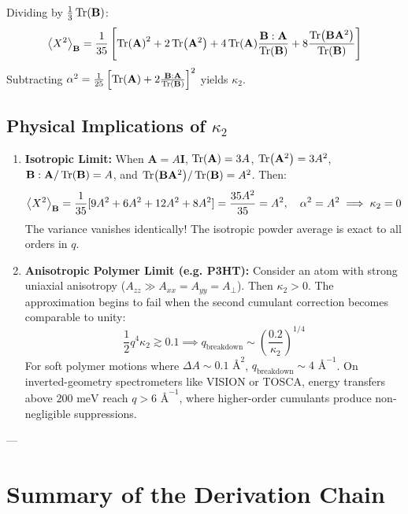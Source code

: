 \documentclass[11pt,a4paper]{article}
\theoremstyle{definition}
\begin{document}
Dividing by $\frac{1}{3}\Tr(\mathbf{B})$:
\begin{equation}
\ev{X^2}_{\mathbf{B}} = \frac{1}{35} \left[ \Tr(\mathbf{A})^2 + 2 \Tr(\mathbf{A}^2) + 4 \Tr(\mathbf{A}) \frac{\mathbf{B}:\mathbf{A}}{\Tr(\mathbf{B})} + 8 \frac{\Tr(\mathbf{B}\mathbf{A}^2)}{\Tr(\mathbf{B})} \right]
\end{equation}
Subtracting $\alpha^2 = \frac{1}{25} \left[ \Tr(\mathbf{A}) + 2 \frac{\mathbf{B}:\mathbf{A}}{\Tr(\mathbf{B})} \right]^2$ yields $\kappa_2$.

\subsection{Physical Implications of $\kappa_2$}
\begin{enumerate}
    \item \textbf{Isotropic Limit:} When $\mathbf{A} = A \mathbf{I}$, $\Tr(\mathbf{A}) = 3A$, $\Tr(\mathbf{A}^2) = 3A^2$, $\mathbf{B}:\mathbf{A}/\Tr(\mathbf{B}) = A$, and $\Tr(\mathbf{B}\mathbf{A}^2)/\Tr(\mathbf{B}) = A^2$.
    Then:
    \begin{equation}
    \ev{X^2}_{\mathbf{B}} = \frac{1}{35} [9A^2 + 6A^2 + 12A^2 + 8A^2] = \frac{35A^2}{35} = A^2, \quad \alpha^2 = A^2 \implies \kappa_2 = 0
    \end{equation}
    The variance vanishes identically! The isotropic powder average is exact to all orders in $q$.

    \item \textbf{Anisotropic Polymer Limit (e.g. P3HT):} Consider an atom with strong uniaxial anisotropy ($A_{zz} \gg A_{xx} = A_{yy} = A_\perp$). Then $\kappa_2 > 0$. The approximation begins to fail when the second cumulant correction becomes comparable to unity:
    \begin{equation}
    \frac{1}{2} q^4 \kappa_2 \gtrsim 0.1 \implies q_{\text{breakdown}} \sim \left( \frac{0.2}{\kappa_2} \right)^{1/4}
    \end{equation}
    For soft polymer motions where $\Delta A \sim 0.1\text{ \AA}^2$, $q_{\text{breakdown}} \sim 4\text{ \AA}^{-1}$. On inverted-geometry spectrometers like VISION or TOSCA, energy transfers above $200\text{ meV}$ reach $q > 6\text{ \AA}^{-1}$, where higher-order cumulants produce non-negligible suppressions.
\end{enumerate}

---

\section{Summary of the Derivation Chain}
\end{document}
